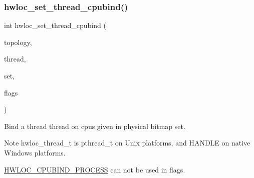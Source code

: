 \subsubsection{\texorpdfstring{hwloc\+\_\+set\+\_\+thread\+\_\+cpubind()}{hwloc\_set\_thread\_cpubind()}}
{\footnotesize\ttfamily int hwloc\+\_\+set\+\_\+thread\+\_\+cpubind (\begin{DoxyParamCaption}\item[{\hyperlink{a00186_ga9d1e76ee15a7dee158b786c30b6a6e38}{hwloc\+\_\+topology\+\_\+t}}]{topology,  }\item[{hwloc\+\_\+thread\+\_\+t}]{thread,  }\item[{\hyperlink{a00183_ga1f784433e9b606261f62d1134f6a3b25}{hwloc\+\_\+const\+\_\+cpuset\+\_\+t}}]{set,  }\item[{int}]{flags }\end{DoxyParamCaption})}



Bind a thread {\ttfamily thread} on cpus given in physical bitmap {\ttfamily set}. 

\begin{DoxyNote}{Note}
{\ttfamily hwloc\+\_\+thread\+\_\+t} is {\ttfamily pthread\+\_\+t} on Unix platforms, and {\ttfamily H\+A\+N\+D\+LE} on native Windows platforms.

\hyperlink{a00190_gga217dc8d373f8958cc93c154ebce1c71ca2e0dd0128dac6b03408c7dd170477fdc}{H\+W\+L\+O\+C\+\_\+\+C\+P\+U\+B\+I\+N\+D\+\_\+\+P\+R\+O\+C\+E\+SS} can not be used in {\ttfamily flags}. 
\end{DoxyNote}
